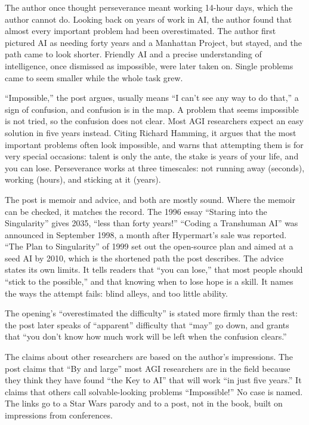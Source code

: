 \begin{afterword}
\summaryhead

The author once thought perseverance meant working 14-hour days, which the author cannot do. Looking back on years of work in AI, the author found that almost every important problem had been overestimated. The author first pictured AI as needing forty years and a Manhattan Project, but stayed, and the path came to look shorter. Friendly AI and a precise understanding of intelligence, once dismissed as impossible, were later taken on. Single problems came to seem smaller while the whole task grew.

``Impossible,'' the post argues, usually means ``I can't see any way to do that,'' a sign of confusion, and confusion is in the map. A problem that seems impossible is not tried, so the confusion does not clear. Most AGI researchers expect an easy solution in five years instead. Citing Richard Hamming, it argues that the most important problems often look impossible, and warns that attempting them is for very special occasions: talent is only the ante, the stake is years of your life, and you can lose. Perseverance works at three timescales: not running away (seconds), working (hours), and sticking at it (years).

\responsehead

The post is memoir and advice, and both are mostly sound. Where the memoir can be checked, it matches the record. The 1996 essay ``Staring into the Singularity'' gives 2035, ``less than forty years!'' ``Coding a Transhuman AI'' was announced in September 1998, a month after Hypermart's sale was reported. ``The Plan to Singularity'' of 1999 set out the open-source plan and aimed at a seed AI by 2010, which is the shortened path the post describes. The advice states its own limits. It tells readers that ``you can lose,'' that most people should ``stick to the possible,'' and that knowing when to lose hope is a skill. It names the ways the attempt fails: blind alleys, and too little ability.

The opening's ``overestimated the difficulty'' is stated more firmly than the rest: the post later speaks of ``apparent'' difficulty that ``may'' go down, and grants that ``you don't know how much work will be left when the confusion clears.''

The claims about other researchers are based on the author's impressions. The post claims that ``By and large'' most AGI researchers are in the field because they think they have found ``the Key to AI'' that will work ``in just five years.'' It claims that others call solvable-looking problems ``Impossible!'' No case is named. The links go to a Star Wars parody and to a post, not in the book, built on impressions from conferences.


\end{afterword}
